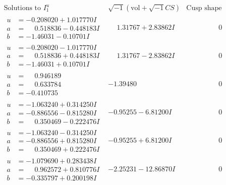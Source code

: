 \documentclass[1p]{elsarticle_modified}
\theoremstyle{definition}
\newcommand{\I}{\sqrt{-1}}
\begin{document}
$$\begin{array}{c|c|c}  
\text{Solutions to }I^u_{1}& \I (\text{vol} + \sqrt{-1}CS) & \text{Cusp shape}\\
 \hline 
\begin{aligned}
u &= -0.208020 + 1.017770 I \\
a &= \phantom{-}0.518836 - 0.448183 I \\
b &= -1.46031 - 0.10701 I\end{aligned}
 & \phantom{-}1.31767 + 2.83862 I & \phantom{-0.000000 } 0 \\ \hline\begin{aligned}
u &= -0.208020 - 1.017770 I \\
a &= \phantom{-}0.518836 + 0.448183 I \\
b &= -1.46031 + 0.10701 I\end{aligned}
 & \phantom{-}1.31767 - 2.83862 I & \phantom{-0.000000 } 0 \\ \hline\begin{aligned}
u &= \phantom{-}0.946189\phantom{ +0.000000I} \\
a &= \phantom{-}0.633784\phantom{ +0.000000I} \\
b &= -0.410735\phantom{ +0.000000I}\end{aligned}
 & -1.39480\phantom{ +0.000000I} & \phantom{-0.000000 } 0 \\ \hline\begin{aligned}
u &= -1.063240 + 0.314250 I \\
a &= -0.886556 - 0.815280 I \\
b &= \phantom{-}0.350469 - 0.222476 I\end{aligned}
 & -0.95255 - 6.81200 I & \phantom{-0.000000 } 0 \\ \hline\begin{aligned}
u &= -1.063240 - 0.314250 I \\
a &= -0.886556 + 0.815280 I \\
b &= \phantom{-}0.350469 + 0.222476 I\end{aligned}
 & -0.95255 + 6.81200 I & \phantom{-0.000000 } 0 \\ \hline\begin{aligned}
u &= -1.079690 + 0.283438 I \\
a &= \phantom{-}0.962572 + 0.810776 I \\
b &= -0.335797 + 0.200198 I\end{aligned}
 & -2.25231 - 12.86870 I & \phantom{-0.000000 } 0 \\ \hline\begin{aligned}

\end{aligned}
\end{array}$$
\end{document}
